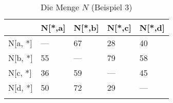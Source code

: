 
\begin{longtable}[c]{|l|l|l|l|l|}
\hline
            & N{[}*,a{]} & N{[}*,b{]} & N{[}*,c{]} & N{[}*,d{]} \\ \hline
\endfirsthead
%
\endhead
%
N{[}a, *{]} & ---        & 67         & 28         & 40         \\ \hline
N{[}b, *{]} & 55         & ---        & 79         & 58         \\ \hline
N{[}c, *{]} & 36         & 59         & ---        & 45         \\ \hline
N{[}d, *{]} & 50         & 72         & 29         & ---        \\ \hline
\caption{Die Menge $N$ (Beispiel 3)}
\label{beispiel3N}\\
\end{longtable}